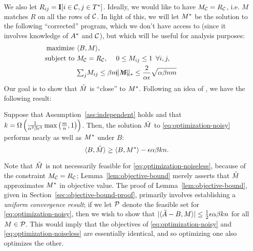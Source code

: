 We also let $R_{ij} = \mathbf{I}[i \in \mathcal{C}, j \in T^*]$.
Ideally, we would like to have $M_{\mathcal{C}} = R_{\mathcal{C}}$, i.e. $M$ matches $R$ on 
all the rows of $\mathcal{C}$. In light of this, 
we will let $M^*$ be the solution to the following ``corrected'' program, which 
we don't have access to (since it involves knowledge of $A^*$ and $\mathcal{C}$), 
but which will be useful for analysis purposes:
\begin{align}
\label{eq:optimization-noiseless}
\text{maximize } &\langle \Aa, M \rangle, \\
\notag \text{ subject to } &M_{\good} = R_{\good}, 
  &&\hskip-0.4in 0 \leq M_{ij} \leq 1 \,\,\, \forall i,j,  \\
\notag  &{\textstyle \sum_j} M_{ij} \leq \beta m \,\,\, \forall i, 
  &&\hskip-0.4in \|M\|_* \leq \frac{2}{\alpha\epsilon}\sqrt{\alpha\beta nm} \phantom{xxxxxxx}
\end{align}
Our goal is to show that $\tilde{M}$ is ``close'' to $M^*$. 
Following an idea of \citet{guedon2014community}, we have the following result:
\begin{lemma}
\label{lem:objective-bound}
Suppose that Assumption~\ref{ass:independent} holds and that 
$k = \Omega\left( \frac{1}{\alpha^3\beta\epsilon^4}\max\left( \frac{m}{n},1 \right) \right)$. 
Then, the solution $\tilde{M}$ to \eqref{eq:optimization-noisy} performs nearly as 
well as $M^*$ under $B$:
\begin{equation}
\label{eq:objective-bound}
\langle B, \tilde{M} \rangle \geq \langle B, M^* \rangle - \epsilon \alpha\beta kn.
\end{equation}
\end{lemma}
Note that $\tilde{M}$ is not necessarily feasible for \eqref{eq:optimization-noiseless}, 
because of the constraint $M_{\mathcal{C}} = R_{\mathcal{C}}$; Lemma~\ref{lem:objective-bound} 
merely asserts that $\tilde{M}$ approximates $M^*$ in objective value. The proof of 
Lemma~\ref{lem:objective-bound}, given in Section~\ref{sec:objective-bound-proof}, 
primarily involves establishing a 
\emph{uniform convergence result}; if we let $\mathcal{P}$ denote the feasible set for 
\eqref{eq:optimization-noisy}, then we wish to show that 
$|\langle \tilde{A} - B, M \rangle| \leq \frac{1}{2}\epsilon \alpha\beta kn$ for all 
$M \in \mathcal{P}$. This would imply that the objectives of 
\eqref{eq:optimization-noisy} and \eqref{eq:optimization-noiseless} are 
essentially identical, and so optimizing one also optimizes the other.


